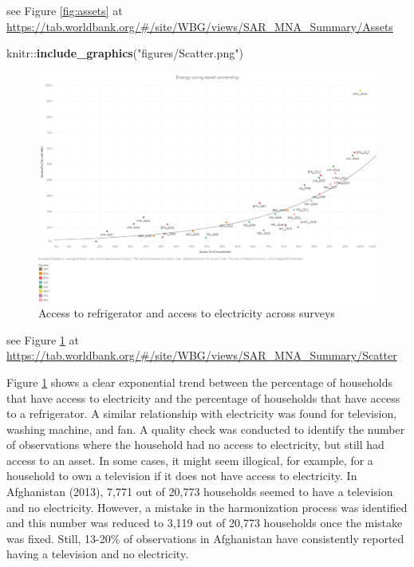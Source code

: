 \documentclass[13 pt,]{book}
\newenvironment{Shaded}{\begin{snugshade}}{\end{snugshade}}
\newcommand{\KeywordTok}[1]{\textcolor[rgb]{0.13,0.29,0.53}{\textbf{{#1}}}}
\newcommand{\StringTok}[1]{\textcolor[rgb]{0.31,0.60,0.02}{{#1}}}
\newcommand{\NormalTok}[1]{{#1}}
\begin{document}
see Figure \ref{fig:assets} at
\url{https://tab.worldbank.org/\#/site/WBG/views/SAR_MNA_Summary/Assets}

\begin{Shaded}
\begin{Highlighting}[]
\NormalTok{knitr::}\KeywordTok{include_graphics}\NormalTok{(}\StringTok{"figures/Scatter.png"}\NormalTok{)}
\end{Highlighting}
\end{Shaded}

\begin{figure}

{\centering \includegraphics[width=0.8\linewidth]{figures/Scatter} 

}

\caption{Access to refrigerator and access to electricity across surveys}\label{fig:scatter}
\end{figure}

see Figure \ref{fig:scatter} at
\url{https://tab.worldbank.org/\#/site/WBG/views/SAR_MNA_Summary/Scatter}

Figure \ref{fig:scatter} shows a clear exponential trend between the
percentage of households that have access to electricity and the
percentage of households that have access to a refrigerator. A similar
relationship with electricity was found for television, washing machine,
and fan. A quality check was conducted to identify the number of
observations where the household had no access to electricity, but still
had access to an asset. In some cases, it might seem illogical, for
example, for a household to own a television if it does not have access
to electricity. In Afghanistan (2013), 7,771 out of 20,773 households
seemed to have a television and no electricity. However, a mistake in
the harmonization process was identified and this number was reduced to
3,119 out of 20,773 households once the mistake was fixed. Still,
13-20\% of observations in Afghanistan have consistently reported having
a television and no electricity.
\end{document}
